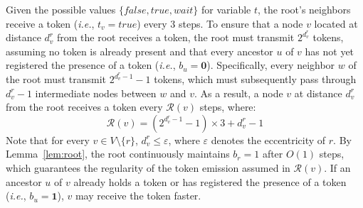 \documentclass[a4paper, 12pt]{article}
\newcommand{\bz}{\mathbf{0}}
\newcommand{\bo}{\mathbf{1}}
\begin{document}
Given the possible values $\{\mathit{false}, \mathit{true}, \mathit{wait}\}$ 
for variable $t$, the root's neighbors receive a token (\textit{i.e.}, 
$t_v = \mathit{true}$) every $3$ steps. To ensure that a node $v$ located 
at distance $d^r_v$ from the root receives a token, the root must transmit 
$2^{d^r_v}$ tokens, assuming no token is already present and that every 
ancestor $u$ of $v$ has not yet registered the presence of a token 
(\textit{i.e.}, $b_u = \bz$). Specifically, every neighbor $w$ of the root 
must transmit $2^{d^r_v - 1} - 1$ tokens, which must subsequently pass 
through $d^r_v - 1$ intermediate nodes between $w$ and $v$. As a result, 
a node $v$ at distance $d^r_v$ from the root receives a token every 
$\mathcal{R}(v)$ steps, where:
\begin{equation}
    \mathcal{R}(v) = (2^{d^r_v - 1} - 1) \times 3 + d^r_v - 1
    \label{eq:Rv}
\end{equation}
Note that for every $v \in V \setminus \{r\}$, $d^r_v \leq \varepsilon$, 
where $\varepsilon$ denotes the eccentricity of $r$. By 
Lemma~\ref{lem:root}, the root continuously maintains $b_r = 1$ after 
$O(1)$ steps, which guarantees the regularity of the token emission assumed 
in $\mathcal{R}(v)$. If an ancestor $u$ of $v$ already holds a token or 
has registered the presence of a token (\textit{i.e.}, $b_u = \bo$), $v$ 
may receive the token faster.
\end{document}
